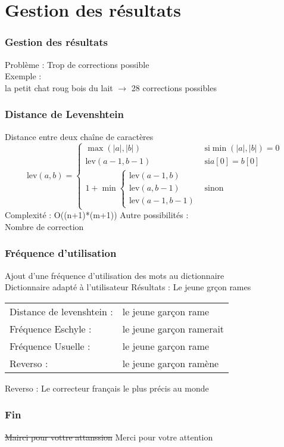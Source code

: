 \documentclass{beamer}
\renewcommand{\t}{\text}
\newcommand{\ra}{\longrightarrow}
\begin{document}
\section{Gestion des résultats}
\begin{frame}
   \frametitle{Gestion des résultats}
   Problème : Trop de corrections possible \\
   Exemple :\\
   la petit chat roug bois du lait $\ra$ 28 corrections possibles\\
\end{frame}

\begin{frame}
   \frametitle{Distance de Levenshtein}
   Distance entre deux chaîne de caractères
   $$
   \t{lev}(a,b) = \begin{cases} \max(|a|,|b|) & \t{si} \min(|a|,|b|) = 0 \\
                                \t{lev}(a-1, b-1) & \t{si} a[0] = b[0] \\
                                1 + \min \begin{cases} \t{lev}(a-1,b) \\ \t{lev}(a, b-1) \\ \t{lev}(a-1, b-1) \end{cases} & \t{sinon}
                  \end{cases}
   $$
   Complexité : O((n+1)*(m+1))\medbreak
   Autre possibilités :\\
   Nombre de correction
\end{frame}

\begin{frame}
   \frametitle{Fréquence d'utilisation}
   Ajout d'une fréquence d'utilisation des mots au dictionnaire\\
   Dictionnaire adapté à l'utilisateur\bigbreak
   Résultats :\medbreak
   Le jeune grçon rames\bigbreak
   \begin{tabular}{ll}
      Distance de levenshtein : &le jeune garçon rame\\
      Fréquence Eschyle : &le jeune garçon ramerait\\
      Fréquence Usuelle : &le jeune garçon rame\\
      Reverso : &le jeune garçon ramène
   \end{tabular}\bigbreak
   Reverso : \guillemotleft Le correcteur français le plus précis au monde \guillemotright
\end{frame}

\begin{frame}
   \frametitle{Fin}
   \centering
   \Huge{\sout{Mairci pour vottre attanssion}}\medbreak
   \Huge{Merci pour votre attention}
\end{frame}
\end{document}
